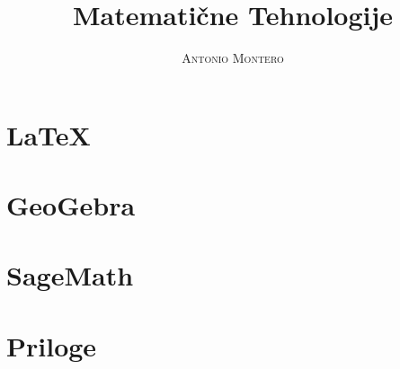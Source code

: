 \documentclass[a4paper,11pt,oneside]{book}
\title{\Huge \textbf{Matematične Tehnologije}}
\author{\textsc{Antonio Montero}}
\begin{document}
\sloppy

\frontmatter
\maketitle

\tableofcontents

\mainmatter

% 
% 

\section{LaTeX}













\section{GeoGebra}











\section{SageMath}







\section{Priloge}






\end{document}
